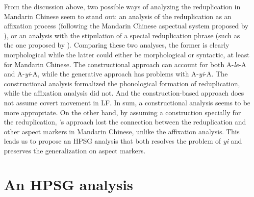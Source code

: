 \documentclass[
a4paper,
10pt,
oneside,
]{scrartcl}
\begin{document}
From the discussion above, two possible ways of analyzing the reduplication in Mandarin Chinese seem
to stand out: an analysis of the reduplication as an affixation process (following the Mandarin
Chinese aspectual system proposed by \citet{Huangetal2009}), or an analysis with the stipulation of
a special reduplication phrase (such as the one proposed by \citet{Ghomeshietal2004}). Comparing
these two analyses, the former is clearly morphological while the latter could either be
morphological or syntactic, at least for Mandarin Chinese. The constructional approach can account
for both A-\emph{le}-A and A-\emph{yi}-A, while the generative approach has problems with
A-\emph{yi}-A. The constructional analysis formalized the phonological formation of reduplication,
while the affixation analysis did not. And the construction-based approach does not assume covert
movement in LF. In sum, a constructional analysis seems to be more appropriate. On the other hand,
by assuming a construction specially for the reduplication, \citet{Ghomeshietal2004}'s approach lost
the connection between the reduplication and other aspect markers in Mandarin Chinese, unlike the
affixation analysis. This leads us to propose an HPSG analysis that both resolves the problem of
\emph{yi} and preserves the generalization on aspect markers. 





\section[HPSG]{An HPSG analysis}\label{sec:HPSG}
\end{document}
